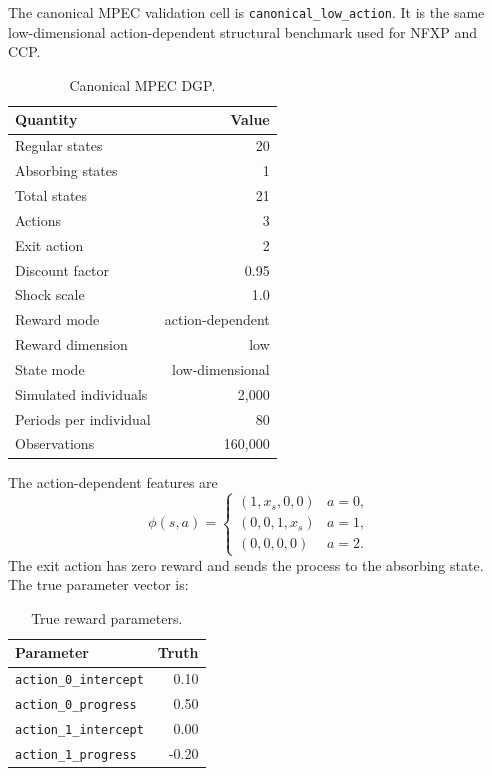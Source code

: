 \documentclass[10pt]{article}
\begin{document}
The canonical MPEC validation cell is \texttt{canonical\_low\_action}. It is
the same low-dimensional action-dependent structural benchmark used for NFXP
and CCP.

\begin{table}[H]
\centering\small
\caption{Canonical MPEC DGP.}
\begin{tabular}{lr}
\toprule
Quantity & Value \\
\midrule
Regular states & 20 \\
Absorbing states & 1 \\
Total states & 21 \\
Actions & 3 \\
Exit action & 2 \\
Discount factor & 0.95 \\
Shock scale & 1.0 \\
Reward mode & action-dependent \\
Reward dimension & low \\
State mode & low-dimensional \\
Simulated individuals & 2,000 \\
Periods per individual & 80 \\
Observations & 160,000 \\
\bottomrule
\end{tabular}
\end{table}

The action-dependent features are
\[
\phi(s,a)
=
\begin{cases}
(1, x_s, 0, 0) & a = 0,\\
(0, 0, 1, x_s) & a = 1,\\
(0, 0, 0, 0) & a = 2.
\end{cases}
\]
The exit action has zero reward and sends the process to the absorbing state.
The true parameter vector is:

\begin{table}[H]
\centering\small
\caption{True reward parameters.}
\begin{tabular}{lr}
\toprule
Parameter & Truth \\
\midrule
\texttt{action\_0\_intercept} & 0.10 \\
\texttt{action\_0\_progress} & 0.50 \\
\texttt{action\_1\_intercept} & 0.00 \\
\texttt{action\_1\_progress} & -0.20 \\
\bottomrule
\end{tabular}
\end{table}
\end{document}
